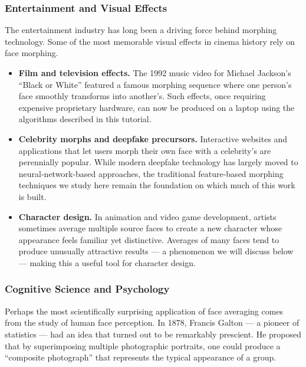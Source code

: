 \subsubsection{Entertainment and Visual Effects}

The entertainment industry has long been a driving force behind morphing technology. Some of the
most memorable visual effects in cinema history rely on face morphing.

\begin{itemize}
    \item \textbf{Film and television effects.} The 1992 music video for Michael Jackson's
    ``Black or White'' featured a famous morphing sequence where one person's face smoothly
    transforms into another's. Such effects, once requiring expensive proprietary hardware, can
    now be produced on a laptop using the algorithms described in this tutorial.

    \item \textbf{Celebrity morphs and deepfake precursors.} Interactive websites and applications
    that let users morph their own face with a celebrity's are perennially popular. While modern
    deepfake technology has largely moved to neural-network-based approaches, the traditional
    feature-based morphing techniques we study here remain the foundation on which much of this
    work is built.

    \item \textbf{Character design.} In animation and video game development, artists sometimes
    average multiple source faces to create a new character whose appearance feels familiar yet
    distinctive. Averages of many faces tend to produce unusually attractive results --- a
    phenomenon we will discuss below --- making this a useful tool for character design.
\end{itemize}


\subsubsection{Cognitive Science and Psychology}

Perhaps the most scientifically surprising application of face averaging comes from the study of
human face perception. In 1878, Francis Galton --- a pioneer of statistics --- had an idea that
turned out to be remarkably prescient. He proposed that by superimposing multiple photographic
portraits, one could produce a ``composite photograph'' that represents the typical appearance of
a group.

